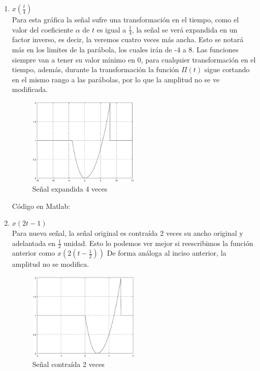 \documentclass[10pt,a4paper]{report}
\begin{document}
\begin{enumerate}
  \item $x\left(\frac{t}{4}\right)$\\
  \newline Para esta gráfica la señal sufre una transformación en el tiempo, como el valor del coeficiente $\alpha$ de $t$ es igual a $\frac{1}{4}$, la señal se verá expandida en un factor inverso, es decir, la veremos cuatro veces más ancha. Esto se notará más en los limites de la parábola, los cuales irán de -4 a 8. Las funciones siempre van a tener su valor mínimo en 0, para cualquier transformación en el tiempo, además, durante la transformación la función $\Pi(t)$ sigue cortando en el mismo rango a las parábolas, por lo que la amplitud no se ve modificada.

    \begin{figure}[H]
      \begin{center}
        \includegraphics[width=0.5\textwidth]{Ejercicio2/IncisoA}
        \caption{Señal expandida 4 veces}
        \label{fig:IncisoA}
      \end{center}
    \end{figure}
    
Código en Matlab:
    

  \item $x\left(2t-1\right)$\\
    \newline Para nueva señal, la señal original es contraída 2 veces su ancho original y adelantada en $\frac{1}{2}$ unidad. Esto lo podemos ver mejor si reescribimos la función anterior como $x\left(2\left(t-\frac{1}{2}\right)\right)$ De forma análoga al inciso anterior, la amplitud no se modifica.

    \begin{figure}[H]
      \begin{center}
        \includegraphics[width=0.5\textwidth]{Ejercicio2/IncisoB}
        \caption{Señal contraída 2 veces}
        \label{fig:IncisoB}
      \end{center}
    \end{figure}
    

\end{enumerate}
\end{document}
